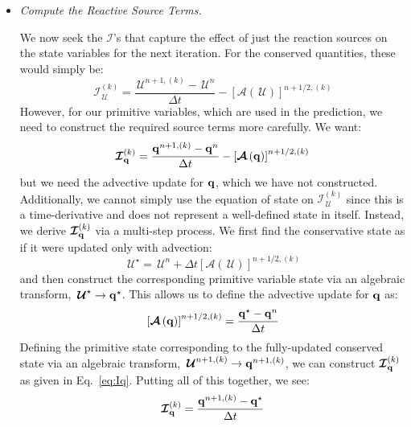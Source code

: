 \documentclass[times,modern]{aastex62}
\newcommand{\Ic}{{\boldsymbol{\mathcal{I}}}}
\newcommand{\Uc}{{\,\bm{\mathcal{U}}}}
\newcommand{\qb}{{\bf q}}
\newcommand{\Adv}[1]{{\left [\boldsymbol{\mathcal{A}} \left(#1\right)\right]}}
\newcommand{\MarginPar}[1]{\marginpar{\vskip-\baselineskip\raggedright\tiny\sffamily\hrule\smallskip{\color{red}#1}\par\smallskip\hrule}}
\begin{document}
\begin{itemize}
\begin{itemize}
  \item {\em Compute the Reactive Source Terms.}

    We now seek the $\Ic$'s that capture the effect of just the
    reaction sources on the state variables for the next iteration.
    For the conserved quantities, these would simply be: \MarginPar{fix signs on A}
    \begin{equation}
      \Ic^{(k)}_{\Uc} = \frac{\Uc^{n+1,(k)} - \Uc^n}{\Delta t} - \Adv{\Uc}^{n+1/2,(k)}
    \end{equation}
    However, for our primitive variables, which are used in the
    prediction, we need to construct the required source terms more
    carefully.  We want:
    \begin{equation}
      \label{eq:Iq}
      \Ic^{(k)}_{\qb} = \frac{\qb^{n+1,(k)} - \qb^n}{\Delta t} - \Adv{\qb}^{n+1/2,(k)}
    \end{equation}
    but we need the advective update for $\qb$, which we have not
    constructed.  Additionally, we cannot simply use the equation of
    state on $\Ic^{(k)}_{\Uc}$ since this is a time-derivative and
    does not represent a well-defined state in itself.  Instead, we
    derive $\Ic^{(k)}_{\qb}$ via a multi-step process.  We first find
    the conservative state as if it were updated only with advection:
    \begin{equation}
      \Uc^\star = \Uc^n + \Delta t \Adv{\Uc}^{n+1/2,(k)}
    \end{equation}
    and then construct the corresponding primitive variable state via an algebraic transform,
    $\Uc^\star \rightarrow \qb^\star$.
    This allows us to define the advective update for $\qb$ as:
    \begin{equation}
      \Adv{\qb}^{n+1/2,(k)} = \frac{\qb^\star - \qb^n}{\Delta t}
    \end{equation}
    Defining the primitive state corresponding to the fully-updated
    conserved state via an algebraic transform, $\Uc^{n+1,(k)}
    \rightarrow \qb^{n+1,(k)}$, we can construct $\Ic^{(k)}_{\qb}$ as given
    in Eq.~\ref{eq:Iq}.
    Putting all of this together, we see:
    \begin{equation}
      \Ic^{(k)}_{\qb} = \frac{\qb^{n+1,(k)} - \qb^\star}{\Delta t}
    \end{equation}





  \end{itemize}

\end{itemize}
\end{document}
